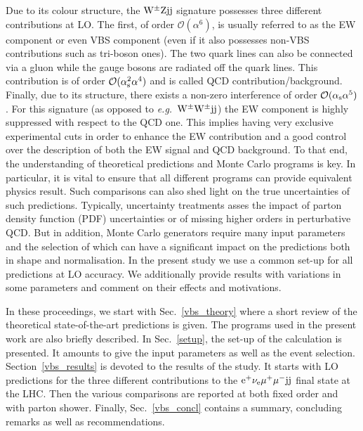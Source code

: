 \documentclass[11pt]{cernrep}
\begin{document}
Due to its colour structure, the ${\rm W}^{\pm}{\rm Z}{\rm j}{\rm j}$ signature possesses three different contributions at LO.
The first, of order $\mathcal{O} (\alpha^6)$, is usually referred to as the EW component or even VBS component (even if it also possesses non-VBS contributions such as tri-boson ones).
The two quark lines can also be connected via a gluon while the gauge bosons are radiated off the quark lines.
This contribution is of order $\mathcal{O} (\alpha_{\rm s}^2\alpha^4)$ and is called QCD contribution/background.
Finally, due to its structure, there exists a non-zero interference of order $\mathcal{O} (\alpha_{\rm s}\alpha^5)$.
For this signature (as opposed to \emph{e.g.}\ ${\rm W}^\pm{\rm W}^\pm{\rm j}{\rm j}$) the EW component is highly suppressed with respect to the QCD one.
This implies having very exclusive experimental cuts in order to enhance the EW contribution and a good control over the description of both the EW signal and QCD background.
To that end, the understanding of theoretical predictions and Monte Carlo programs is key.
In particular, it is vital to ensure that all different programs can provide equivalent physics result.
Such comparisons can also shed light on the true uncertainties of such predictions.
Typically, uncertainty treatments asses the impact of parton density function (PDF) uncertainties or of missing higher orders in perturbative QCD.
But in addition, Monte Carlo generators require many input parameters and the selection of which can have a significant impact on the predictions both in shape and normalisation.
In the present study we use a common set-up for all predictions at LO accuracy. We additionally provide results with
variations in some parameters and comment on their effects and motivations.

In these proceedings, we start with Sec.~\ref{vbs_theory} where a short review of the theoretical state-of-the-art predictions is given.
The programs used in the present work are also briefly described.
In Sec.~\ref{setup}, the set-up of the calculation is presented.
It amounts to give the input parameters as well as the event selection.
Section~\ref{vbs_results} is devoted to the results of the study.
It starts with LO predictions for the three different contributions to the ${\rm e}^+  \nu_{\rm e}  \mu^+ \mu^- {\rm j} {\rm j}$ final state at the LHC.
Then the various comparisons are reported at both fixed order and with parton shower.
Finally, Sec.~\ref{vbs_concl} contains a summary, concluding remarks as well as recommendations.
\end{document}
